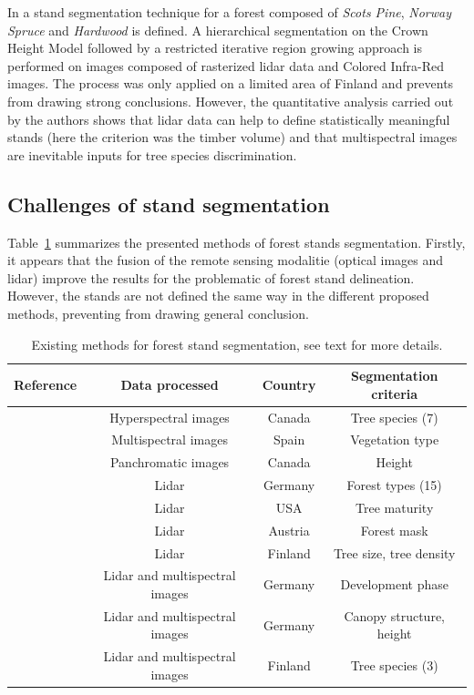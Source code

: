 In \citep{leppanen2008automatic} a stand segmentation technique for a forest composed of \textit{Scots Pine}, \textit{Norway Spruce} and \textit{Hardwood} is defined. A hierarchical segmentation on the Crown Height Model followed by a restricted iterative region growing approach is performed on images composed of rasterized lidar data and Colored Infra-Red images. The process was only applied on a limited area of Finland and prevents from drawing strong conclusions. However, the quantitative analysis carried out by the authors shows that lidar data can help to define statistically meaningful stands (here the criterion was the timber volume) and that multispectral images are inevitable inputs for tree species discrimination. \\

\subsection{Challenges of stand segmentation}
Table~\ref{table:methods} summarizes the presented methods of forest stands segmentation. Firstly, it appears that the fusion of the remote sensing modalitie (optical images and lidar) improve the results for the problematic of forest stand delineation. However, the stands are not defined the same way in the different proposed methods, preventing from drawing general conclusion.
\begin{table}
\begin{center}
\begin{tabular}{|l|c|c|c|}
\hline
\textbf{Reference} & \textbf{Data processed} & \textbf{Country} & \textbf{Segmentation criteria} \\
\hline
\cite{leckie2003stand} & Hyperspectral images & Canada & Tree species (7) \\
\hline
\cite{hernando2012spatial} & Multispectral images & Spain & Vegetation type \\
\hline
\cite{Mora20102474} & Panchromatic images & Canada & Height \\
\hline
\cite{koch2009airborne} & Lidar & Germany & Forest types (15) \\
\hline
\cite{sullivan2009object} & Lidar & USA & Tree maturity \\
\hline
\cite{eysn2012forest} & Lidar &  Austria & Forest mask \\
\hline
\cite{wu2014data} & Lidar & Finland & Tree size, tree density \\
\hline
\cite{tiede2004object} & Lidar and multispectral images & Germany & Development phase \\
\hline
\cite{diedershagen2004automatic} & Lidar and multispectral images & Germany & Canopy structure, height \\
\hline
\cite{leppanen2008automatic} & Lidar and multispectral images & Finland & Tree species (3) \\
\hline
\end{tabular}
\caption{Existing methods for forest stand segmentation, see text for more details.}
\label{table:methods}
\end{center}
\end{table}


